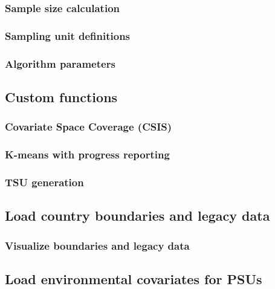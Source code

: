 \documentclass[
  10pt,
  b5paper,
  oneside]{book}
\begin{document}
\subsubsection{Sample size calculation}\label{sample-size-calculation}

\subsubsection{Sampling unit definitions}\label{sampling-unit-definitions}

\subsubsection{Algorithm parameters}\label{algorithm-parameters}

\subsection{Custom functions}\label{custom-functions}

\subsubsection{Covariate Space Coverage (CSIS)}\label{covariate-space-coverage-csis}

\subsubsection{K-means with progress reporting}\label{k-means-with-progress-reporting}

\subsubsection{TSU generation}\label{tsu-generation}

\subsection{Load country boundaries and legacy data}\label{load-boundaries}

\subsubsection{Visualize boundaries and legacy data}\label{visualize-boundaries-and-legacy-data}

\subsection{Load environmental covariates for PSUs}\label{load-covariates-psu}
\end{document}
